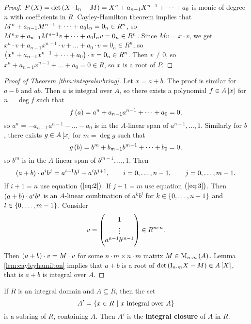 \begin{proof}
$ P\br{X} = \det \br{X \cdot \I_n - M} = X^n + a_{n - 1}X^{n - 1} + \dots + a_0 $ is monic of degree $ n $ with coefficients in $ R $. Cayley-Hamilton theorem implies that $ M^n + a_{n - 1}M^{n - 1} + \dots + a_0\mathrm{I}_n = 0_n \in R^n $, so $ M^nv + a_{n - 1}M^{n - 1}v + \dots + a_0\mathrm{I}_nv = 0_n \in R^n $. Since $ Mv = x \cdot v $, we get $ x^n \cdot v + a_{n - 1}x^{n - 1} \cdot v + \dots + a_0 \cdot v = 0_n \in R^n $, so $ \br{x^n + a_{n - 1}x^{n - 1} + \dots + a_0} \cdot v = 0_n \in R^n $. Then $ v \ne 0 $, so $ x^n + a_{n - 1}x^{n - 1} + \dots + a_0 = 0 \in R $, so $ x $ is a root of $ P $.
\end{proof}

\begin{proof}[Proof of Theorem \ref{thm:integralsubring}]
Let $ x = a + b $. The proof is similar for $ a - b $ and $ ab $. Then $ a $ is integral over $ A $, so there exists a polynomial $ f \in A\sbr{x} $ for $ n = \deg f $ such that
\begin{equation}
\label{eq:2}
f\br{a} = a^n + a_{n - 1}a^{n - 1} + \dots + a_0 = 0,
\end{equation}
so $ a^n = -a_{n - 1}a^{n - 1} - \dots - a_0 $ is in the $ A $-linear span of $ a^{n - 1}, \dots, 1 $. Similarly for $ b $, there exists $ g \in A\sbr{x} $ for $ m = \deg g $ such that
\begin{equation}
\label{eq:3}
g\br{b} = b^m + b_{m - 1}b^{m - 1} + \dots + b_0 = 0,
\end{equation}
so $ b^m $ is in the $ A $-linear span of $ b^{m - 1}, \dots, 1 $. Then
$$ \br{a + b} \cdot a^ib^j = a^{i + 1}b^j + a^ib^{j + 1}, \qquad i = 0, \dots, n - 1, \qquad j = 0, \dots, m - 1. $$
If $ i + 1 = n $ use equation $ \br{\ref{eq:2}} $. If $ j + 1 = m $ use equation $ \br{\ref{eq:3}} $. Then $ \br{a + b} \cdot a^ib^j $ is an $ A $-linear combination of $ a^kb^l $ for $ k \in \cbr{0, \dots, n - 1} $ and $ l \in \cbr{0, \dots, m - 1} $. Consider
$$ v = \begin{pmatrix} 1 \\ \vdots \\ a^{n - 1}b^{m - 1} \end{pmatrix} \in R^{m \cdot n}. $$
Then $ \br{a + b} \cdot v = M \cdot v $ for some $ n \cdot m \times n \cdot m $ matrix $ M \in \M_{n \cdot m}\br{A} $. Lemma \ref{lem:cayleyhamilton} implies that $ a + b $ is a root of $ \det \br{\I_{n \cdot m}X - M} \in A\sbr{X} $, that is $ a + b $ is integral over $ A $.
\end{proof}

\pagebreak

\begin{corollary}
If $ R $ is an integral domain and $ A \subseteq R $, then the set
$$ A' = \cbr{x \in R \st x \ \text{integral over} \ A} $$
is a subring of $ R $, containing $ A $. Then $ A' $ is the \textbf{integral closure} of $ A $ in $ R $.
\end{corollary}

